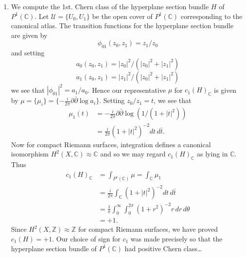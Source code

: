 \begin{enumerate}[start=10]
Finally, let us justify our assumption that $L^*\otimes\overline L^*$ is isomorphic to the trivial line bundle. First observe that $L_z^*\otimes\overline L_z^*$ is the space of Hermitian forms on $L_z$, $z\in X$. Now any convex combination of positive definite Hermitian quadratic forms is positive definite. Therefore, taking trivialisations of $L$ over $\mathcal U$, we may choose a smooth section of $L^*\otimes\overline L^*$ over each $U_i$ which defines a positive definite Hermitian form on the fibres. Glueing together using a smooth partition of unity we obtain a global section of $L^*\otimes\overline L^*$ which restricts to a positive definite Hermitian form on the fibres. Hence we have obtained a non-vanishing smooth section of $L^*\otimes\overline L^*$.
\item We compute the 1st. Chern class of the hyperplane section bundle $H$ of $P^1(\mathbb C)$. Let $\mathcal U=\{U_0,U_1\}$ be the open cover of $P^1(\mathbb C)$ corresponding to the canonical atlas. The transition functions for
the hyperplane section bundle are given by
\[
\phi_{01}(z_0,z_1)=z_1/z_0
\]
and setting
\[
a_0(z_0,z_1)=|z_0|^2/(|z_0|^2+|z_1|^2)
\]
\[
a_1(z_0,z_1)=|z_1|^2/(|z_0|^2+|z_1|^2)
\]
we see that $|\phi_{01}|^2=a_1/a_0$. Hence our representative $\mu$ for $c_1(H)_{\mathbb C}$ is given by $\mu=\{\mu_i\}=\{-\frac i{2\pi}\partial\bar\partial\log a_i\}$. Setting $z_0/z_1=t$, we see that
\[
\begin{aligned}
\mu_1(t)&=-\frac i{2\pi}\partial\bar\partial\log(1/(1+|t|^2))\\
&=\frac i{2\pi}(1+|t|^2)^{-2}dt\,d\bar t.
\end{aligned}
\]
Now for compact Riemann surfaces, integration defines a canonical isomorphism $H^2(X,\mathbb C)\approx\mathbb C$ and so we may regard $c_1(H)_{\mathbb C}$ as lying in $\mathbb C$. Thus
\[
\begin{aligned}
c_1(H)_{\mathbb C}&=\int_{P^1(\mathbb C)}\mu=\int_{\mathbb C}\mu_1\\
&=\frac i{2\pi}\int_{\mathbb C}(1+|t|^2)^{-2}dt\,d\bar t\\
&=\frac1\pi\int_0^\infty\int_0^{2\pi}(1+r^2)^{-2}r\,dr\,d\theta\\
&=+1.
\end{aligned}
\]
Since $H^2(X,\mathbb Z)\approx\mathbb Z$ for compact Riemann surfaces, we have proved $c_1(H)=+1$. Our choice of sign for $c_1$ was made precisely so that the hyperplane section bundle of $P^1(\mathbb C)$ had positive Chern class\ldots

\end{enumerate}

